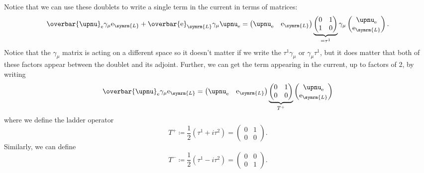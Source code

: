 \documentclass[fleqn]{NotesClass}
\newcommand{\Pparticle}[1]{\mathrm{#1}}
\newcommand{\Pex}{\ensuremath{\Pparticle{e}}}
\newcommand{\Pnu}{\ensuremath{\upnu}}
\newcommand{\Pnue}{\ensuremath{\upnu_{\mathrm{e}}}}
\newcommand{\diracadjoint}[1]{\overbar{#1}}
\newcommand{\Left}{\symrm{L}}
\begin{document}
    Notice that we can use these doublets to write a single term in the current in terms of matrices:
    \begin{equation}
        \diracadjoint{\Pnu}_{\Pex} \gamma_\mu \Pex_{\Left} + \diracadjoint{\Pex}_{\Left} \gamma_\mu \Pnue = 
        \begin{pmatrix}
            \Pnue & \Pex_{\Left}
        \end{pmatrix}
        \underbrace{
        \begin{pmatrix}
            0 & 1\\
            1 & 0
        \end{pmatrix}
        }_{=\tau^1}
        \gamma_\mu
        \begin{pmatrix}
            \Pnue\\ \Pex_{\Left}
        \end{pmatrix}
        .
    \end{equation}
    Notice that the \(\gamma_\mu\) matrix is acting on a different space so it doesn't matter if we write the \(\tau^1\gamma_\mu\) or \(\gamma_\mu\tau^1\), but it does matter that both of these factors appear between the doublet and its adjoint.
    Further, we can get the term appearing in the current, up to factors of 2, by writing
    \begin{equation}
        \diracadjoint{\Pnu}_{\Pex} \gamma_\mu \Pex_{\Left} = 
        \begin{pmatrix}
            \Pnue & \Pex_{\Left}
        \end{pmatrix}
        \underbrace{
        \begin{pmatrix}
            0 & 1\\
            0 & 0
        \end{pmatrix}
        }_{T^+}
        \begin{pmatrix}
            \Pnue \\ \Pex_{\Left}
        \end{pmatrix}
    \end{equation}
    where we define the ladder operator
    \begin{equation}
        T^+ \coloneqq \frac{1}{2}(\tau^1 + i\tau^2) = 
        \begin{pmatrix}
            0 & 1\\
            0 & 0
        \end{pmatrix}
        .
    \end{equation}
    Similarly, we can define
    \begin{equation}
        T^- \coloneqq \frac{1}{2}(\tau^1 - i\tau^2) = 
        \begin{pmatrix}
            0 & 0\\
            0 & 1
        \end{pmatrix}
        .
    \end{equation}
\end{document}
